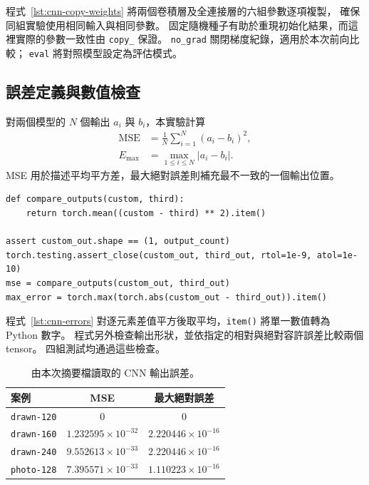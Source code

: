 程式~\ref{lst:cnn-copy-weights} 將兩個卷積層及全連接層的六組參數逐項複製，
確保同組實驗使用相同輸入與相同參數。
固定隨機種子有助於重現初始化結果，而這裡實際的參數一致性由 \texttt{copy\_} 保證。
\texttt{no\_grad} 關閉梯度紀錄，適用於本次前向比較；
\texttt{eval} 將對照模型設定為評估模式。

\subsection{誤差定義與數值檢查}

對兩個模型的 $N$ 個輸出 $a_i$ 與 $b_i$，本實驗計算
\begin{align}
  \mathrm{MSE} &= \frac{1}{N}\sum_{i=1}^{N}(a_i-b_i)^2,
    \label{eq:cnn-mse}\\
  E_{\max} &= \max_{1\leq i\leq N}|a_i-b_i|.
    \label{eq:cnn-max-error}
\end{align}
MSE 用於描述平均平方差，最大絕對誤差則補充最不一致的一個輸出位置。

\begin{lstlisting}[caption={MSE 與輸出一致性檢查},label={lst:cnn-errors}]
def compare_outputs(custom, third):
    return torch.mean((custom - third) ** 2).item()

assert custom_out.shape == (1, output_count)
torch.testing.assert_close(custom_out, third_out, rtol=1e-9, atol=1e-10)
mse = compare_outputs(custom_out, third_out)
max_error = torch.max(torch.abs(custom_out - third_out)).item()
\end{lstlisting}

程式~\ref{lst:cnn-errors} 對逐元素差值平方後取平均，\texttt{item()} 將單一數值轉為 Python 數字。
程式另外檢查輸出形狀，並依指定的相對與絕對容許誤差比較兩個 tensor。
四組測試均通過這些檢查。

\begin{table}[H]
  \centering
  \caption{由本次摘要檔讀取的 CNN 輸出誤差。}
  \label{tab:cnn-errors}
  \begin{tabular}{@{}lcc@{}}
    \toprule
    案例 & MSE & 最大絕對誤差 \\
    \midrule
    \texttt{drawn-120} & $0$ & $0$ \\
    \texttt{drawn-160} & $1.232595\times10^{-32}$ & $2.220446\times10^{-16}$ \\
    \texttt{drawn-240} & $9.552613\times10^{-33}$ & $2.220446\times10^{-16}$ \\
    \texttt{photo-128} & $7.395571\times10^{-33}$ & $1.110223\times10^{-16}$ \\
    \bottomrule
  \end{tabular}
\end{table}

